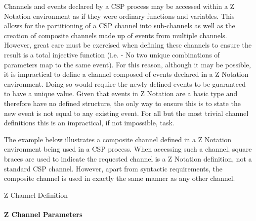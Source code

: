 \documentclass[letterpaper,10pt,draft]{book}
\begin{document}
Channels and events declared by a CSP process may be accessed within a Z Notation
environment as if they were ordinary functions and variables.  This allows for the
partitioning of a CSP channel into sub-channels as well as the creation of composite
channels made up of events from multiple channels.  However, great care must be exercised
when defining these channels to ensure the result is a total injective function
(i.e. - No two unique combinations of parameters map to the same event).  For this
reason, although it may be possible, it is impractical to define a channel composed
of events declared in a Z Notation environment.  Doing so would require the newly
defined events to be guaranteed to have a unique value.  Given that events in Z
Notation are a basic type and therefore have no defined structure, the only way
to ensure this is to state the new event is not equal to any existing event.  For
all but the most trivial channel definitions this is an impractical, if not impossible,
task.

The example below illustrates a composite channel defined in a Z Notation environment
being used in a CSP process.  When accessing such a channel, square braces are used
to indicate the requested channel is a Z Notation definition, not a standard CSP
channel.  However, apart from syntactic requirements, the composite channel is used
in exactly the same manner as any other channel.

\begin{example}
\begin{minipage}[t]{0.49\linewidth}
   
\end{minipage}
\begin{minipage}[t]{0.49\linewidth}
   \azbox
   
\end{minipage}

   \caption{Z Channel Definition}
   \label{ex:ZChan}
\end{example}


\paragraph{Z Channel Parameters}
   \label{sect:CSPZChanParam}
\end{document}
